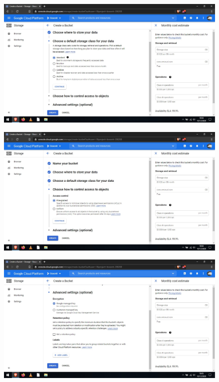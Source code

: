 \documentclass[a4paper,10pt]{article}
\begin{document}
\begin{figure}[H]
\begin{center}
\includegraphics[width=500pt]{./fotos/GoogleCloud/13 - GC.jpg}
\end{center}
\end{figure}

\begin{figure}[H]
\begin{center}
\includegraphics[width=500pt]{./fotos/GoogleCloud/14 - GC.jpg}
\end{center}
\end{figure}

\begin{figure}[H]
\begin{center}
\includegraphics[width=500pt]{./fotos/GoogleCloud/15 - GC.jpg}
\end{center}
\end{figure}
\end{document}
